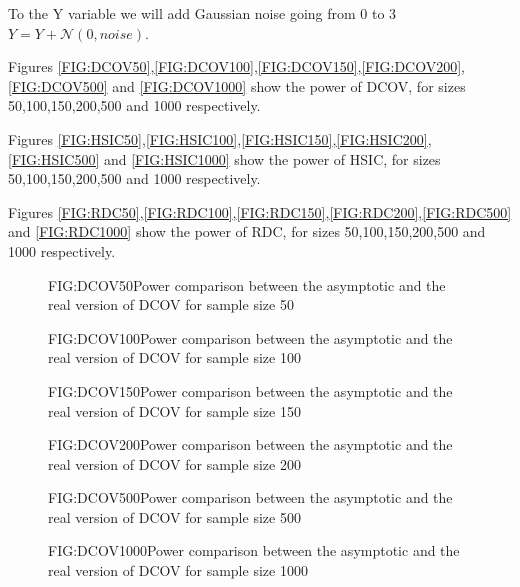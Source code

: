 To the Y variable we will add  Gaussian noise going from 0 to 3
$ Y = Y + \mathcal{N}(0,noise) $.

Figures \ref{FIG:DCOV50},\ref{FIG:DCOV100},\ref{FIG:DCOV150},\ref{FIG:DCOV200},\ref{FIG:DCOV500} and \ref{FIG:DCOV1000} show the power of DCOV,  for sizes 50,100,150,200,500 and 1000 respectively.

Figures \ref{FIG:HSIC50},\ref{FIG:HSIC100},\ref{FIG:HSIC150},\ref{FIG:HSIC200},\ref{FIG:HSIC500} and \ref{FIG:HSIC1000} show the power of HSIC,  for sizes 50,100,150,200,500 and 1000 respectively.

Figures \ref{FIG:RDC50},\ref{FIG:RDC100},\ref{FIG:RDC150},\ref{FIG:RDC200},\ref{FIG:RDC500} and \ref{FIG:RDC1000} show the power of RDC,  for sizes 50,100,150,200,500 and 1000 respectively.

\begin{figure}[DCOV asymptotic size 50]{FIG:DCOV50}{Power comparison between the asymptotic and the real version of DCOV for sample size 50}
\end{figure}
\begin{figure}[DCOV asymptotic size 100]{FIG:DCOV100}{Power comparison between the asymptotic and the real version of DCOV for sample size 100}
\end{figure}
\begin{figure}[DCOV asymptotic size 150]{FIG:DCOV150}{Power comparison between the asymptotic and the real version of DCOV for sample size 150}
\end{figure}
\begin{figure}[DCOV asymptotic size 200]{FIG:DCOV200}{Power comparison between the asymptotic and the real version of DCOV for sample size 200}
\end{figure}
\begin{figure}[DCOV asymptotic size 500]{FIG:DCOV500}{Power comparison between the asymptotic and the real version of DCOV for sample size 500}
\end{figure}
\begin{figure}[DCOV asymptotic size 1000]{FIG:DCOV1000}{Power comparison between the asymptotic and the real version of DCOV for sample size 1000}
\end{figure}

